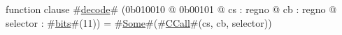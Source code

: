 function clause #\hyperref[zdecode]{decode}# (0b010010 @ 0b00101 @ cs : regno @ cb : regno @ selector : #\hyperref[zbits]{bits}#(11)) = #\hyperref[zSome]{Some}#(#\hyperref[zCCall]{CCall}#(cs, cb, selector))
